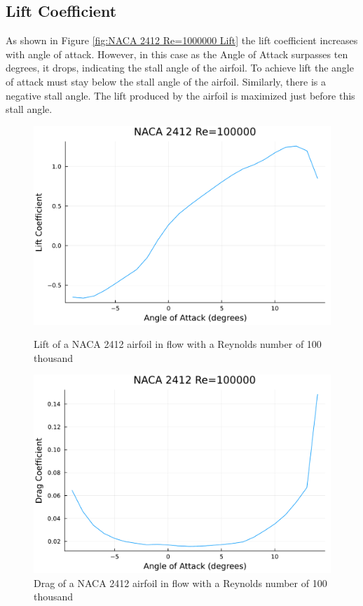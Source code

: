 \documentclass{article}
\begin{document}
\subsection{Lift Coefficient}
As shown in Figure \ref{fig:NACA 2412 Re=1000000 Lift} the lift coefficient increases with angle of attack. However, in this case as the Angle of Attack surpasses ten degrees, it drops, indicating the stall angle of the airfoil. To achieve lift the angle of attack must stay below the stall angle of the airfoil. Similarly, there is a negative stall angle. The lift produced by the airfoil is maximized just before this stall angle.
\begin{figure}[h]
    \centering
\begin{minipage}[b]{0.45\textwidth}
\centering
\includegraphics[width=\textwidth]{NACA 2412 Re=100000_Lift_Coefficent_Plot.pdf}
\caption{Lift of a NACA 2412 airfoil in flow with a Reynolds number of 100 thousand}
\label{fig:NACA 2412 Re=100000 Lift}
\end{minipage}
\begin{minipage}[b]{0.45\textwidth}
\centering
\includegraphics[width=\textwidth]{NACA 2412 Re=100000_Drag_Coefficent_Plot.pdf}
\caption{Drag of a NACA 2412 airfoil in flow with a Reynolds number of 100 thousand}
\label{fig:NACA 2412 Re=100000 Drag}
\end{minipage}
\end{figure}
\end{document}
